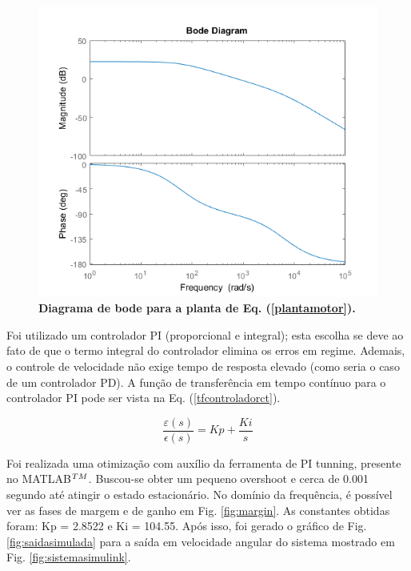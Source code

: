 \documentclass[10pt,fleqn,a4paper]{article}
\begin{document}
	\begin{figure}[ht]
		\begin{center}
			\includegraphics[angle=0, scale=0.7]{images/bode}
		\end{center}
		\caption{\textbf{Diagrama de bode para a planta de Eq. (\ref{plantamotor}).}}
		\label{fig:bode}
	\end{figure}
    
    Foi utilizado um controlador PI (proporcional e integral); esta escolha se deve ao fato de que o termo integral do controlador elimina os erros em regime. Ademais, o controle de velocidade não exige tempo de resposta elevado (como seria o caso de um controlador PD). A função de transferência em tempo contínuo para o controlador PI pode ser vista na Eq. (\ref{tfcontroladorct}).
    
    \begin{equation}
    \frac{\varepsilon(s)}{\epsilon(s)}= Kp + \frac{Ki}{s} \label{tfcontroladorct}
    \end{equation}
    
    Foi realizada uma otimização com auxílio da ferramenta de PI tunning, presente no MATLAB$^{\small{TM}}$. Buscou-se obter um pequeno overshoot e cerca de 0.001 segundo até atingir o estado estacionário. No domínio da frequência, é possível ver as fases de margem e de ganho em Fig. \ref{fig:margin}. As constantes obtidas foram: Kp = 2.8522 e Ki = 104.55. Após isso, foi gerado o gráfico de Fig. \ref{fig:saidasimulada} para a saída em velocidade angular do sistema mostrado em Fig.  \ref{fig:sistemasimulink}.
    
\end{document}
